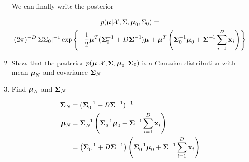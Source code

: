 \documentclass{amsmlaj}
\begin{document}
\begin{problem}
\begin{enumerate}
	We can finally write the posterior

	\begin{multline} \label{}
		p(\bm{\mathbf{\mu}}|\mathcal{X},\Sigma,\bm{\mathbf{\mu}}_0,\Sigma_0) = \\
		(2\pi)^{-D}|\Sigma\Sigma_0|^{-1}\exp\left\{
			-\frac{1}{2}\bm{\mathbf{\mu}}^T(\bm{\mathbf{\Sigma}}_0^{-1}+D\bm{\mathbf{\Sigma}}^{-1})\bm{\mathbf{\mu}}
				+\bm{\mathbf{\mu}}^T\left(
				\bm{\mathbf{\Sigma}}_0^{-1}\bm{\mathbf{\mu}}_0+\bm{\mathbf{\Sigma}}^{-1}\sum_{i=1}^D\bm{\mathbf{x}}_i
			\right)
		\right\}
	\end{multline}

\item Show that the posterior
				$p(\bm{\mathbf{\mu}}|\mathcal{X},\bm{\mathbf{\Sigma}},\bm{\mathbf{\mu}}_0,\bm{\mathbf{\Sigma}}_0)$
				is a Gaussian distribution with mean $\bm{\mathbf{\mu}}_N$ and
				covariance $\bm{\mathbf{\Sigma}}_N$
\item Find $\bm{\mathbf{\mu}}_N$ and $\bm{\mathbf{\Sigma}}_N$

	\begin{equation}
		\begin{split}
			\bm{\mathbf{\Sigma}}_N&=(\bm{\mathbf{\Sigma}}_0^{-1}+D\bm{\mathbf{\Sigma}}^{-1})^{-1} \\
			\bm{\mathbf{\mu}}_N&=\bm{\mathbf{\Sigma}}_N^{-1} \left(
				\bm{\mathbf{\Sigma}}_0^{-1}\bm{\mathbf{\mu}}_0+\bm{\mathbf{\Sigma}}^{-1}\sum_{i=1}^D\bm{\mathbf{x}}_i
			\right) \\
			&=\left(
				\bm{\mathbf{\Sigma}}_0^{-1}+D\bm{\mathbf{\Sigma}}^{-1}
			\right)\left(
			\bm{\mathbf{\Sigma}}_0^{-1}\bm{\mathbf{\mu}}_0+\bm{\mathbf{\Sigma}}^{-1}\sum_{i=1}^D\bm{\mathbf{x}}_i
			\right)
		\end{split}
	\end{equation}

\end{enumerate}
\end{problem}
\end{document}
